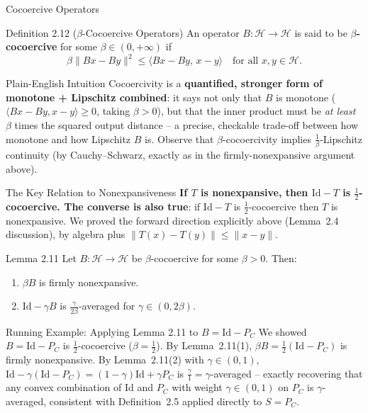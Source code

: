 \documentclass[aspectratio=169,10pt]{beamer}
\newcommand{\Id}{\mathrm{Id}}
\begin{document}
\begin{frame}[allowframebreaks]{Cocoercive Operators}

  \begin{block}{Definition 2.12 ($\beta$-Cocoercive Operators)}
    An operator $B : \mathcal{H} \to \mathcal{H}$ is said to be
    \textbf{$\beta$-cocoercive} for some $\beta \in (0,+\infty)$ if
    \[
      \beta\|Bx - By\|^2 \le \langle Bx - By,\, x-y\rangle
      \quad \text{for all } x,y \in \mathcal{H}.
    \]
  \end{block}

  \begin{block}{Plain-English Intuition}
    Cocoercivity is a \textbf{quantified, stronger form of monotone +
    Lipschitz combined}: it says not only that $B$ is monotone
    ($\langle Bx-By,x-y\rangle \ge 0$, taking $\beta > 0$), but that the
    inner product must be \emph{at least} $\beta$ times the squared output
    distance -- a precise, checkable trade-off between how monotone and how
    Lipschitz $B$ is. Observe that $\beta$-cocoercivity implies
    $\tfrac1\beta$-Lipschitz continuity (by Cauchy--Schwarz, exactly as in
    the firmly-nonexpansive argument above).
  \end{block}

  \begin{block}{The Key Relation to Nonexpansiveness}
    \textbf{If $T$ is nonexpansive, then $\Id - T$ is $\tfrac12$-cocoercive.
    The converse is also true}: if $\Id - T$ is $\tfrac12$-cocoercive then
    $T$ is nonexpansive. We proved the forward direction explicitly above
    (Lemma~2.4 discussion), by algebra plus $\|T(x)-T(y)\|\le\|x-y\|$.
  \end{block}

  \framebreak

  \begin{block}{Lemma 2.11}
    Let $B : \mathcal{H} \to \mathcal{H}$ be $\beta$-cocoercive for some
    $\beta > 0$. Then:
    \begin{enumerate}
      \item[(1)] $\beta B$ is firmly nonexpansive.
      \item[(2)] $\Id - \gamma B$ is $\tfrac{\gamma}{2\beta}$-averaged for
        $\gamma \in (0, 2\beta)$.
    \end{enumerate}
  \end{block}

  \begin{exampleblock}{Running Example: Applying Lemma 2.11 to $B = \Id - P_C$}
    We showed $B = \Id - P_C$ is $\tfrac12$-cocoercive ($\beta = \tfrac12$).
    By Lemma~2.11(1), $\beta B = \tfrac12(\Id - P_C)$ is firmly nonexpansive.
    By Lemma~2.11(2) with $\gamma \in (0,1)$, $\Id - \gamma(\Id-P_C) =
    (1-\gamma)\Id + \gamma P_C$ is $\tfrac{\gamma}{1}=\gamma$-averaged --
    exactly recovering that any convex combination of $\Id$ and $P_C$ with
    weight $\gamma \in (0,1)$ on $P_C$ is $\gamma$-averaged, consistent with
    Definition~2.5 applied directly to $S = P_C$.
  \end{exampleblock}


\end{frame}
\end{document}
